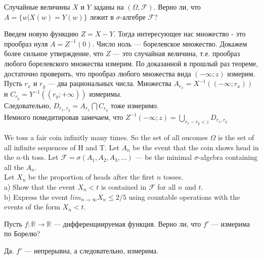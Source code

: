 \begin{problem}
Случайные величины $X$ и $Y$ заданы на $(\Omega,\mathcal{F})$. Верно ли, что $A=\{w|X(w)=Y(w)\}$ лежит в $\sigma$-алгебре $\mathcal{F}$?

\begin{sol}

Введем новую функцию $Z=X-Y$. Тогда интересующее нас множество -
это прообраз нуля $A=Z^{-1}(0)$. Число ноль — борелевское
множество. Докажем более сильное утверждение, что $Z$ — это
случайная величина, т.е. прообраз любого борелевского множества
измерим.
По доказанной в прошлый раз теореме, достаточно проверить, что
прообраз любого множества вида $(-\infty;z)$ измерим. \\
Пусть $r_{x}$ и $r_{y}$ — два рациональных числа. Множества
$A_{r_{x}}=X^{-1}((-\infty;r_{x}))$ и
$C_{r_{y}}=Y^{-1}((r_{y};+\infty))$ измеримы. \\
Следовательно, $D_{r_{x},r_{y}}=A_{r_{x}} \bigcap C_{r_{y}}$ тоже
измеримо. \\
Немного помедитировав замечаем, что $Z^{-1}(-\infty;z)=\bigcup_{r_{x}-r_{y}<z} D_{r_{x},r_{y}}$
\end{sol}
\end{problem}

\begin{problem}
We toss a fair coin infinitly many times. So the set of all oucomes $\Omega$ is the set of all infinite sequences of H and T. Let $A_{n}$ be the event that the coin shows head in the $n$-th toss. Let $\mathcal{F}=\sigma(A_{1},A_{2},A_{3},\ldots)$ — be the minimal $\sigma$-algebra containing all the $A_{n}$. \\
Let $X_{n}$ be the proportion of heads after the first $n$ tosses.\\
a) Show that the event $X_{n}<t$ is contained in $\mathcal{F}$ for all $n$ and $t$. \\
b) Express the event $lim_{n\to\infty}X_{n}\le 2/5$ using countable operations with the events of the form $X_{n}<t$.

\begin{sol}

\end{sol}
\end{problem}

\begin{problem}
Пусть $f:\mathbb{R}\to\mathbb{R}$ — дифференциируемая функция. Верно ли, что $f'$ — измерима по Борелю?

\begin{sol}
Да. $ f' $ — непрерывна, а следовательно, измерима.
\end{sol}
\end{problem}

